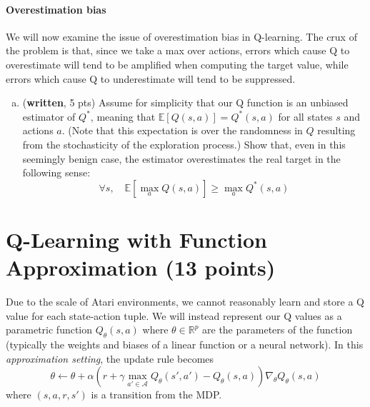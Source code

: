 \documentclass{article}
\newif\ifanswers
\newcommand{\ifans}[1]{\ifanswers \color{red} \textbf{Solution: } #1 \color{black} \else {} \fi}
\begin{document}
\paragraph{Overestimation bias}
We will now examine the issue of overestimation bias in Q-learning. The crux of the problem is that, since we take a max over actions, errors which cause Q to overestimate will tend to be amplified when computing the target value, while errors which cause Q to underestimate will tend to be suppressed.

\begin{enumerate}[(b)]
\item (\textbf{written}, 5 pts) Assume for simplicity that our Q function is an unbiased estimator of $Q^*$, meaning that $\mathbb{E}[Q(s,a)] = Q^*(s,a)$ for all states $s$ and actions $a$. (Note that this expectation is over the randomness in $Q$ resulting from the stochasticity of the exploration process.)
Show that, even in this seemingly benign case, the estimator overestimates the real target in the following sense:
$$
\forall s, \quad \mathbb{E}\left[ \max_a Q(s,a) \right] \ge \max_a Q^*(s,a)
$$

\ifans{
}
\end{enumerate}


\section{Q-Learning with Function Approximation (13 points)} 
Due to the scale of Atari environments, we cannot reasonably learn and store a Q value for each state-action tuple. We will instead represent our Q values as a parametric function $Q_{\theta}(s,a)$ where $\theta \in \mathbb{R}^p$ are the parameters of the function (typically the weights and biases of a linear function or a neural network). In this \emph{approximation setting}, the update rule becomes
\begin{equation}
\theta \leftarrow \theta + \alpha\left(r+\gamma \max_{a' \in \mathcal{A}} Q_{\theta}(s', a') - Q_{\theta}(s, a)\right) \nabla_{\theta}Q_{\theta}(s, a) \label{eqn:faq}
\end{equation}
where $(s,a,r,s')$ is a transition from the MDP.\\
\end{document}

